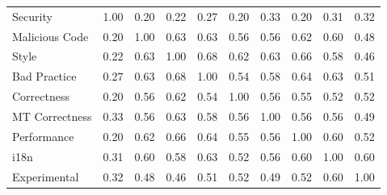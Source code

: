 
\begin{tabular}{lccccccccc}
\hline
Security & 1.00 & 0.20 & 0.22 & 0.27 & 0.20 & 0.33 & 0.20 & 0.31 & 0.32\\
Malicious Code & 0.20 & 1.00 & 0.63 & 0.63 & 0.56 & 0.56 & 0.62 & 0.60 & 0.48\\
Style & 0.22 & 0.63 & 1.00 & 0.68 & 0.62 & 0.63 & 0.66 & 0.58 & 0.46\\
Bad Practice & 0.27 & 0.63 & 0.68 & 1.00 & 0.54 & 0.58 & 0.64 & 0.63 & 0.51\\
Correctness & 0.20 & 0.56 & 0.62 & 0.54 & 1.00 & 0.56 & 0.55 & 0.52 & 0.52\\
MT Correctness & 0.33 & 0.56 & 0.63 & 0.58 & 0.56 & 1.00 & 0.56 & 0.56 & 0.49\\
Performance & 0.20 & 0.62 & 0.66 & 0.64 & 0.55 & 0.56 & 1.00 & 0.60 & 0.52\\
i18n & 0.31 & 0.60 & 0.58 & 0.63 & 0.52 & 0.56 & 0.60 & 1.00 & 0.60\\
Experimental & 0.32 & 0.48 & 0.46 & 0.51 & 0.52 & 0.49 & 0.52 & 0.60 & 1.00\\
\hline
\end{tabular}
